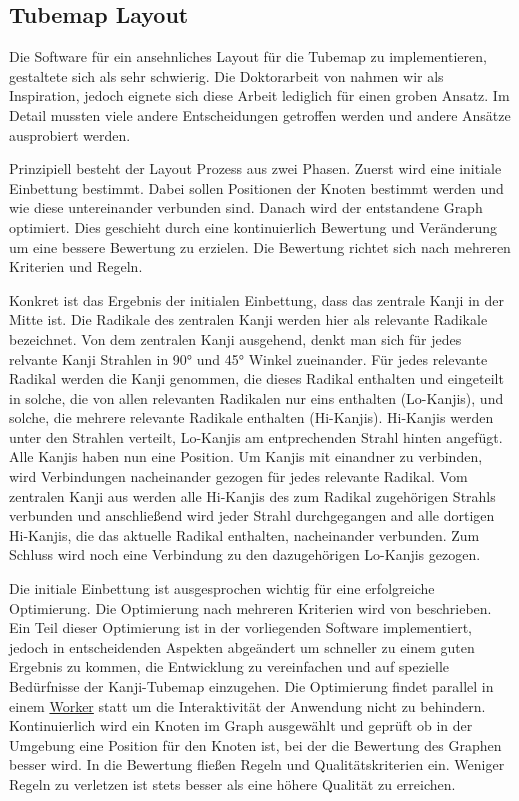 \subsection{Tubemap Layout}

Die Software für ein ansehnliches Layout für die Tubemap zu
implementieren, gestaltete sich als sehr schwierig. Die Doktorarbeit von
\cite{automaticlayoutmetro08} nahmen wir als Inspiration, jedoch eignete
sich diese Arbeit lediglich für einen groben Ansatz. Im Detail mussten
viele andere Entscheidungen getroffen werden und andere Ansätze
ausprobiert werden.

Prinzipiell besteht der Layout Prozess aus zwei Phasen. Zuerst wird eine
initiale Einbettung bestimmt. Dabei sollen Positionen der Knoten
bestimmt werden und wie diese untereinander verbunden sind. Danach wird
der entstandene Graph optimiert. Dies geschieht durch eine
kontinuierlich Bewertung und Veränderung um eine bessere Bewertung zu
erzielen. Die Bewertung richtet sich nach mehreren Kriterien und Regeln.

Konkret ist das Ergebnis der initialen Einbettung, dass das zentrale
Kanji in der Mitte ist. Die Radikale des zentralen Kanji werden hier als
relevante Radikale bezeichnet. Von dem zentralen Kanji ausgehend, denkt
man sich für jedes relvante Kanji Strahlen in 90° und 45° Winkel
zueinander. Für jedes relevante Radikal werden die Kanji genommen, die
dieses Radikal enthalten und eingeteilt in solche, die von allen
relevanten Radikalen nur eins enthalten (Lo-Kanjis), und solche, die
mehrere relevante Radikale enthalten (Hi-Kanjis). Hi-Kanjis werden unter
den Strahlen verteilt, Lo-Kanjis am entprechenden Strahl hinten
angefügt. Alle Kanjis haben nun eine Position. Um Kanjis mit einandner
zu verbinden, wird Verbindungen nacheinander gezogen für jedes relevante
Radikal. Vom zentralen Kanji aus werden alle Hi-Kanjis des zum Radikal
zugehörigen Strahls verbunden und anschließend wird jeder Strahl
durchgegangen and alle dortigen Hi-Kanjis, die das aktuelle Radikal
enthalten, nacheinander verbunden. Zum Schluss wird noch eine Verbindung
zu den dazugehörigen Lo-Kanjis gezogen.

Die initiale Einbettung ist ausgesprochen wichtig für eine erfolgreiche
Optimierung. Die Optimierung nach mehreren Kriterien wird von
\cite{automaticmetromap11} beschrieben. Ein Teil dieser Optimierung ist
in der vorliegenden Software implementiert, jedoch in entscheidenden
Aspekten abgeändert um schneller zu einem guten Ergebnis zu kommen, die
Entwicklung zu vereinfachen und auf spezielle Bedürfnisse der
Kanji-Tubemap einzugehen. Die Optimierung findet parallel in einem
\href{http://www.whatwg.org/specthes/web-apps/current-work/multipage/workers.html}{Worker}
statt um die Interaktivität der Anwendung nicht zu behindern.
Kontinuierlich wird ein Knoten im Graph ausgewählt und geprüft ob in der
Umgebung eine Position für den Knoten ist, bei der die Bewertung des
Graphen besser wird. In die Bewertung fließen Regeln und
Qualitätskriterien ein. Weniger Regeln zu verletzen ist stets besser als
eine höhere Qualität zu erreichen.

